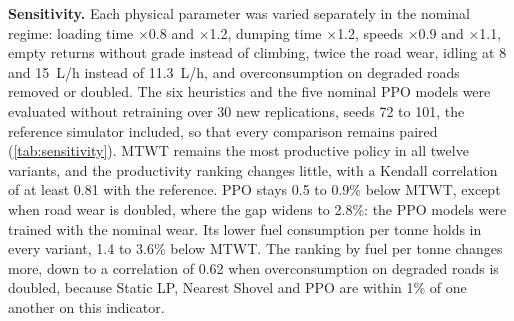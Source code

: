 \documentclass[11pt,a4paper]{article}
\newif\ifcorrmarks
\newcommand{\corr}[1]{\ifcorrmarks\textcolor{corrcolor}{#1}\else#1\fi}
\newenvironment{corrbloc}{\par\ifcorrmarks\color{corrcolor}\fi}{\par}
\begin{document}
\begin{corrbloc}
\textbf{Sensitivity.} Each physical parameter was varied separately in the nominal regime: loading time $\times$0.8 and $\times$1.2, dumping time $\times$1.2, speeds $\times$0.9 and $\times$1.1, empty returns without grade instead of climbing, twice the road wear, idling at 8 and 15~L/h instead of 11.3~L/h, and overconsumption on degraded roads removed or doubled. The six heuristics and the five nominal PPO models were evaluated without retraining over 30 new replications, seeds 72 to 101, the reference simulator included, so that every comparison remains paired (\cref{tab:sensitivity}). MTWT remains the most productive policy in all twelve variants, and the productivity ranking changes little, with a Kendall correlation of at least 0.81 with the reference. PPO stays 0.5 to 0.9\% below MTWT, except when road wear is doubled, where the gap widens to 2.8\%: the PPO models were trained with the nominal wear. Its lower fuel consumption per tonne holds in every variant, 1.4 to 3.6\% below MTWT. The ranking by fuel per tonne changes more, down to a correlation of 0.62 when overconsumption on degraded roads is doubled, because \corr{Static LP}, Nearest Shovel and PPO are within 1\% of one another on this indicator.


\end{corrbloc}
\end{document}
